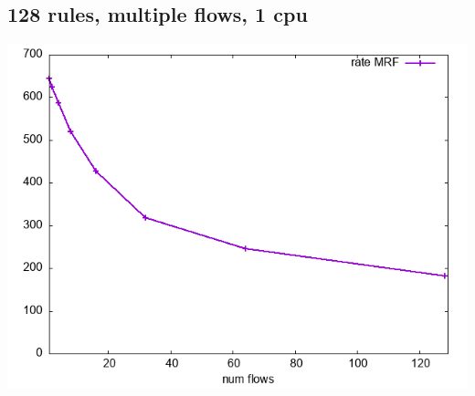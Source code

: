 \documentclass[11pt]{article}
\begin{document}
\subsection*{128 rules, multiple flows, 1 cpu}
\label{sec:org82dd75f}
\begin{center}
\includegraphics[width=.9\linewidth]{plot-1core-numflows.png}
\end{center}
\end{document}
